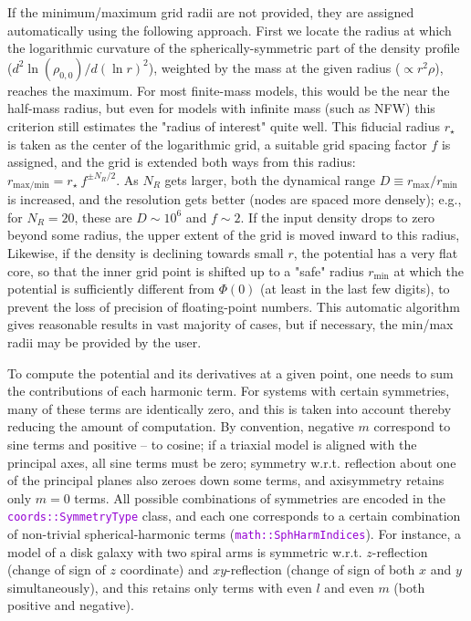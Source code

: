 \documentclass[12pt]{article}
\newcommand{\ttt}[1]{\textcolor{darkviolet}{\texttt{#1}}}
\begin{document}
If the minimum/maximum grid radii are not provided, they are assigned automatically using the following approach. First we locate the radius at which the logarithmic curvature of the spherically-symmetric part of the density profile ($d^2\ln(\rho_{0,0})/d(\ln r)^2$), weighted by the mass at the given radius ($\propto r^2\rho$), reaches the maximum. For most finite-mass models, this would be the near the half-mass radius, but even for models with infinite mass (such as NFW) this criterion still estimates the "radius of interest" quite well. This fiducial radius $r_\star$ is taken as the center of the logarithmic grid, a suitable grid spacing factor $f$ is assigned, and the grid is extended both ways from this radius: $r_\mathrm{max/min} = r_\star\: f^{\pm N_R/2}$. As $N_R$ gets larger, both the dynamical range $D\equiv r_\mathrm{max}/r_\mathrm{min}$ is increased, and the resolution gets better (nodes are spaced more densely); e.g., for $N_R=20$, these are $D\sim 10^6$ and $f\sim 2$. If the input density drops to zero beyond some radius, the upper extent of the grid is moved inward to this radius, Likewise, if the density is declining towards small $r$, the potential has a very flat core, so that the inner grid point is shifted up to a "safe" radius $r_\mathrm{min}$ at which the potential is sufficiently different from $\Phi(0)$ (at least in the last few digits), to prevent the loss of precision of floating-point numbers. This automatic algorithm gives reasonable results in vast majority of cases, but if necessary, the min/max radii may be provided by the user.

To compute the potential and its derivatives at a given point, one needs to sum the contributions of each harmonic term. For systems with certain symmetries, many of these terms are identically zero, and this is taken into account thereby reducing the amount of computation. By convention, negative $m$ correspond to sine terms and positive -- to cosine; if a triaxial model is aligned with the principal axes, all sine terms must be zero; symmetry w.r.t. reflection about one of the principal planes also zeroes down some terms, and axisymmetry retains only $m=0$ terms. All possible combinations of symmetries are encoded in the \ttt{coords::SymmetryType} class, and each one corresponds to a certain combination of non-trivial spherical-harmonic terms (\ttt{math::SphHarmIndices}). For instance, a model of a disk galaxy with two spiral arms is symmetric w.r.t. $z$-reflection (change of sign of $z$ coordinate) and $xy$-reflection (change of sign of both $x$ and $y$ simultaneously), and this retains only terms with even $l$ and even $m$ (both positive and negative).
\end{document}
